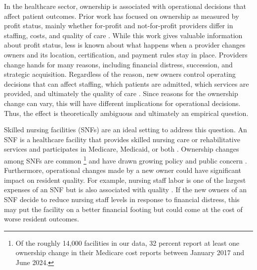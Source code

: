 \documentclass[12pt]{article}
\begin{document}
In the healthcare sector, ownership is associated with operational decisions that affect patient outcomes. Prior work has focused on ownership as measured by profit status, mainly whether for-profit and not-for-profit providers differ in staffing, costs, and quality of care \citep{grabowski_stevenson_2008, eggleston_et_al_2008, comondore_et_al_2009, holmes_1996}. While this work gives valuable information about profit status, less is known about what happens when a provider changes owners and its location, certification, and payment rules stay in place. Providers change hands for many reasons, including financial distress, succession, and strategic acquisition. Regardless of the reason, new owners control operating decisions that can affect staffing, which patients are admitted, which services are provided, and ultimately the quality of care \citep{bowblis_2011, lu_lu_2022}. 
Since reasons for the ownership change can vary, this will have different implications for operational decisions. Thus, the effect is theoretically ambiguous and ultimately an empirical question.

Skilled nursing facilities (SNFs) are an ideal setting to address this question. An SNF is a healthcare facility that provides skilled nursing care or rehabilitative services and participates in Medicare, Medicaid, or both \citep{eCFR42CFR476.1}. Ownership changes among SNFs are common \citep{prusynski_humbert_mroz_2023, OliveiraBlanco2024}\footnote{Of the roughly 14,000 facilities in our data, 32 percent report at least one ownership change in their Medicare cost reports between January 2017 and June 2024.} and have drawn growing policy and public concern \citep{Khan2024PrivateCapital,MurphyScanlon2026, AFREF2026PEPolling, HealthcareDive2025PEReport}. Furthermore, operational changes made by a new owner could have significant impact on resident quality. For example, nursing staff labor is one of the largest expenses of an SNF \citep{hawk_et_al_2022} but is also associated with quality \citep{bowblis_brunt_2025, lin_2014, zhang_grabowski_2004, harrington_et_al_2000}. If the new owners of an SNF decide to reduce nursing staff levels in response to financial distress, this may put the facility on a better financial footing but could come at the cost of worse resident outcomes.
\end{document}
